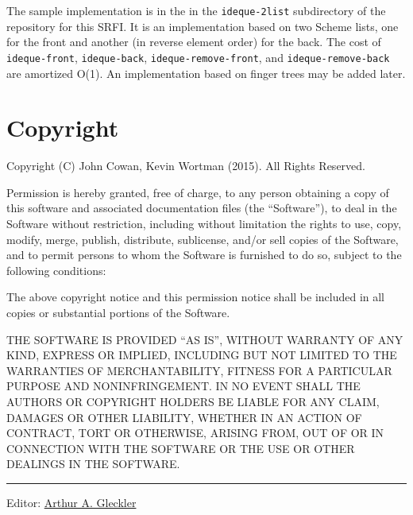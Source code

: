 The sample implementation is in the in the \texttt{ideque-2list}
subdirectory of the repository for this SRFI. It is an implementation
based on two Scheme lists, one for the front and another (in reverse
element order) for the back. The cost of \texttt{ideque-front},
\texttt{ideque-back}, \texttt{ideque-remove-front}, and
\texttt{ideque-remove-back} are amortized O(1). An implementation based
on finger trees may be added later.

\section{Copyright}\label{copyright}

Copyright (C) John Cowan, Kevin Wortman (2015). All Rights Reserved.

Permission is hereby granted, free of charge, to any person obtaining a
copy of this software and associated documentation files (the
``Software''), to deal in the Software without restriction, including
without limitation the rights to use, copy, modify, merge, publish,
distribute, sublicense, and/or sell copies of the Software, and to
permit persons to whom the Software is furnished to do so, subject to
the following conditions:

The above copyright notice and this permission notice shall be included
in all copies or substantial portions of the Software.

THE SOFTWARE IS PROVIDED ``AS IS'', WITHOUT WARRANTY OF ANY KIND,
EXPRESS OR IMPLIED, INCLUDING BUT NOT LIMITED TO THE WARRANTIES OF
MERCHANTABILITY, FITNESS FOR A PARTICULAR PURPOSE AND NONINFRINGEMENT.
IN NO EVENT SHALL THE AUTHORS OR COPYRIGHT HOLDERS BE LIABLE FOR ANY
CLAIM, DAMAGES OR OTHER LIABILITY, WHETHER IN AN ACTION OF CONTRACT,
TORT OR OTHERWISE, ARISING FROM, OUT OF OR IN CONNECTION WITH THE
SOFTWARE OR THE USE OR OTHER DEALINGS IN THE SOFTWARE.

\begin{center}\rule{0.5\linewidth}{\linethickness}\end{center}

Editor: \href{mailto:srfi-editors+at+srfi+dot+schemers+dot+org}{Arthur
A. Gleckler}
